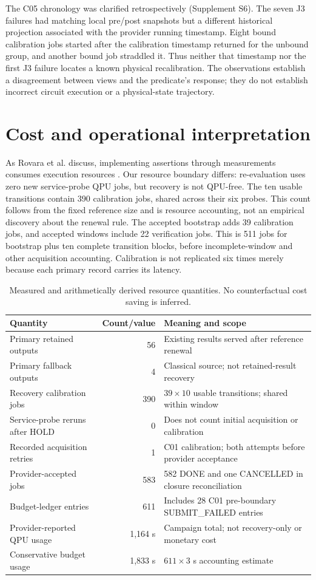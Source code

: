 \documentclass[pdflatex,sn-mathphys-num]{sn-jnl}
\begin{document}
The C05 chronology was clarified retrospectively (Supplement S6). The seven J3 failures had matching local pre/post snapshots but a different historical projection associated with the provider running timestamp. Eight bound calibration jobs started after the calibration timestamp returned for the unbound group, and another bound job straddled it. Thus neither that timestamp nor the first J3 failure locates a known physical recalibration. The observations establish a disagreement between views and the predicate's response; they do not establish incorrect circuit execution or a physical-state trajectory.

\section{Cost and operational interpretation}
As Rovara et al. discuss, implementing assertions through measurements consumes execution resources \cite{rovara}. Our resource boundary differs: re-evaluation uses zero new service-probe QPU jobs, but recovery is not QPU-free. The ten usable transitions contain 390 calibration jobs, shared across their six probes. This count follows from the fixed reference size and is resource accounting, not an empirical discovery about the renewal rule. The accepted bootstrap adds 39 calibration jobs, and accepted windows include 22 verification jobs. This is 511 jobs for bootstrap plus ten complete transition blocks, before incomplete-window and other acquisition accounting. Calibration is not replicated six times merely because each primary record carries its latency.

\begin{table}[htbp]\centering\small
\begin{tabularx}{\linewidth}{l r Y}\toprule
Quantity & Count/value & Meaning and scope\\\midrule
Primary retained outputs & 56 & Existing results served after reference renewal\\
Primary fallback outputs & 4 & Classical source; not retained-result recovery\\
Recovery calibration jobs & 390 & $39\times10$ usable transitions; shared within window\\
Service-probe reruns after HOLD & 0 & Does not count initial acquisition or calibration\\
Recorded acquisition retries & 1 & C01 calibration; both attempts before provider acceptance\\
Provider-accepted jobs & 583 & 582 DONE and one CANCELLED in closure reconciliation\\
Budget-ledger entries & 611 & Includes 28 C01 pre-boundary SUBMIT\_FAILED entries\\
Provider-reported QPU usage & 1,164 s & Campaign total; not recovery-only or monetary cost\\
Conservative budget usage & 1,833 s & $611\times3$ s accounting estimate\\\bottomrule
\end{tabularx}
\caption{Measured and arithmetically derived resource quantities. No counterfactual cost saving is inferred.}\label{tab:cost}
\end{table}
\end{document}
